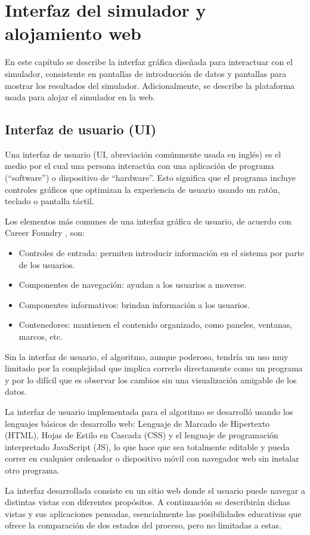 \chapter{Interfaz del simulador y alojamiento web}
\par En este capítulo se describe la interfaz gráfica diseñada para interactuar con el simulador, consistente en pantallas de introducción de datos y pantallas para mostrar los resultados del simulador. Adicionalmente, se describe la plataforma usada para alojar el simulador en la web.

\section{Interfaz de usuario (UI)}
\par Una interfaz de usuario (UI, abreviación comúnmente usada en inglés) es el medio por el cual una persona interactúa con una aplicación de programa (``software'') o dispositivo de ``hardware''. Esto significa que el programa incluye controles gráficos que optimizan la experiencia de usuario usando un ratón, teclado o pantalla táctil.
\par Los elementos más comunes de una interfaz gráfica de usuario, de acuerdo con Career Foundry \cite{ui}, son:
\begin{itemize}
\item Controles de entrada: permiten introducir información en el sistema por parte de los usuarios.
\item Componentes de navegación: ayudan a los usuarios a moverse.
\item Componentes informativos: brindan información a los usuarios.
\item Contenedores: mantienen el contenido organizado, como paneles, ventanas, marcos, etc.
\end{itemize}
\par Sin la interfaz de usuario, el algoritmo, aunque poderoso, tendría un uso muy limitado por la complejidad que implica correrlo directamente como un programa y por lo difícil que es observar los cambios sin una visualización amigable de los datos.
\par La interfaz de usuario implementada para el algoritmo se desarrolló usando los lenguajes básicos de desarrollo web: Lenguaje de Marcado de Hipertexto (HTML), Hojas de Estilo en Cascada (CSS) y el lenguaje de programación interpretado JavaScript (JS), lo que hace que sea totalmente editable y pueda correr en cualquier ordenador o dispositivo móvil con navegador web sin instalar otro programa. 
\par La interfaz desarrollada consiste en un sitio web donde el usuario puede navegar a distintas vistas con diferentes propósitos. A continuación se describirán dichas vistas y sus aplicaciones pensadas, esencialmente las posibilidades educativas que ofrece la comparación de dos estados del proceso, pero no limitadas a estas.

